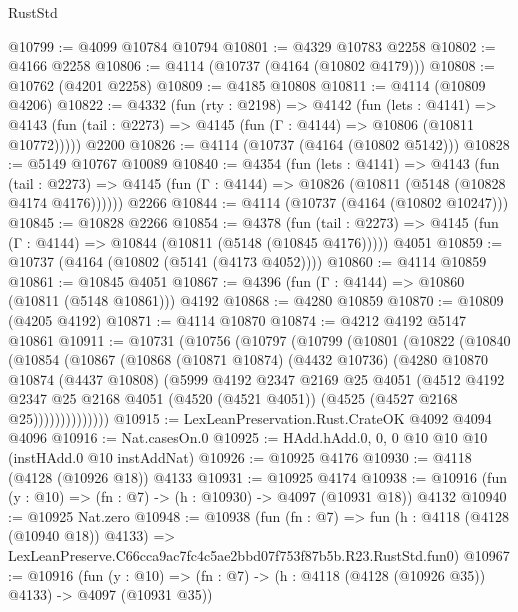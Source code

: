 \begin{lexlean}{RustStd}
\begin{coremodule}
@10799 := @4099 @10784 @10794
@10801 := @4329 @10783 @2258
@10802 := @4166 @2258
@10806 := @4114 (@10737 (@4164 (@10802 @4179)))
@10808 := @10762 (@4201 @2258)
@10809 := @4185 @10808
@10811 := @4114 (@10809 @4206)
@10822 := @4332
    (fun (rty : @2198) =>
    @4142
      (fun (lets : @4141) =>
      @4143 (fun (tail : @2273) => @4145 (fun (Γ : @4144) => @10806 (@10811 @10772)))))
    @2200
@10826 := @4114 (@10737 (@4164 (@10802 @5142)))
@10828 := @5149 @10767 @10089
@10840 := @4354
    (fun (lets : @4141) =>
    @4143
      (fun (tail : @2273) =>
      @4145 (fun (Γ : @4144) => @10826 (@10811 (@5148 (@10828 @4174 @4176))))))
    @2266
@10844 := @4114 (@10737 (@4164 (@10802 @10247)))
@10845 := @10828 @2266
@10854 := @4378
    (fun (tail : @2273) => @4145 (fun (Γ : @4144) => @10844 (@10811 (@5148 (@10845 @4176)))))
    @4051
@10859 := @10737 (@4164 (@10802 (@5141 (@4173 @4052))))
@10860 := @4114 @10859
@10861 := @10845 @4051
@10867 := @4396 (fun (Γ : @4144) => @10860 (@10811 (@5148 @10861))) @4192
@10868 := @4280 @10859
@10870 := @10809 (@4205 @4192)
@10871 := @4114 @10870
@10874 := @4212 @4192 @5147 @10861
@10911 := @10731
    (@10756
      (@10797
        (@10799
          (@10801
            (@10822
              (@10840
                (@10854
                  (@10867
                    (@10868
                      (@10871 @10874)
                      (@4432 @10736)
                      (@4280
                        @10870
                        @10874
                        (@4437 @10808)
                        (@5999
                          @4192
                          @2347
                          @2169
                          @25
                          @4051
                          (@4512
                            @4192
                            @2347
                            @25
                            @2168
                            @4051
                            (@4520 (@4521 @4051))
                            (@4525 (@4527 @2168 @25))))))))))))))
@10915 := LexLeanPreservation.Rust.CrateOK @4092 @4094 @4096
@10916 := Nat.casesOn.{0}
@10925 := HAdd.hAdd.{0, 0, 0} @10 @10 @10 (instHAdd.{0} @10 instAddNat)
@10926 := @10925 @4176
@10930 := @4118 (@4128 (@10926 @18)) @4133
@10931 := @10925 @4174
@10938 := @10916 (fun (y : @10) => (fn : @7) -> (h : @10930) -> @4097 (@10931 @18)) @4132
@10940 := @10925 Nat.zero
@10948 := @10938
    (fun (fn : @7) =>
    fun (h : @4118 (@4128 (@10940 @18)) @4133) =>
    LexLeanPreserve.C66cca9ac7fc4c5ae2bbd07f753f87b5b.R23.RustStd.fun0)
@10967 := @10916
    (fun (y : @10) => (fn : @7) -> (h : @4118 (@4128 (@10926 @35)) @4133) -> @4097 (@10931 @35))

\end{coremodule}
\end{lexlean}
